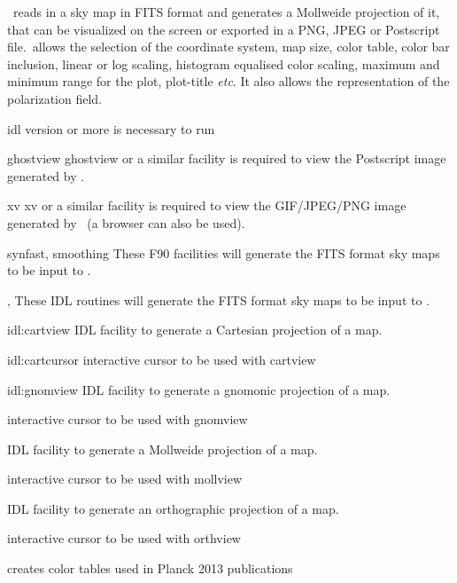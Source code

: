 \begin{codedescription}
{\thedocid \ reads in a \healpix sky map in FITS format and generates a
Mollweide projection of it, that can be visualized on the screen or
exported in a PNG, JPEG or Postscript file.\thedocid \  allows the selection of
the coordinate system, map size, color table, color bar inclusion,
linear or log scaling, histogram equalised
color scaling, maximum and 
minimum range for the plot, plot-title {\it etc}. It also allows the representation of the
polarization field. }
\end{codedescription}


%

\newpage
\begin{related}
  \begin{sulist}{} %
  \item[idl] version \idlversion or more is necessary to run \thedocid
  \item[ghostview] ghostview or a similar facility is required to view
	  the Postscript image generated by \thedocid.
  \item[xv] xv or a similar facility is required to view the
            GIF/JPEG/PNG image generated by \thedocid \ (a browser can also 
            be used).
  \item[synfast, smoothing] These F90 \healpix facilities will generate the FITS format 
            sky maps to be input to \thedocid.
  \item[\htmlref{isynfast}{idl:isynfast}, \htmlref{ismoothing}{idl:ismoothing}] These IDL routines will generate the FITS format 
            sky maps to be input to \thedocid.
  \item[{\htmlref{cartview} {idl:cartview}}] 
	IDL facility to generate a Cartesian projection of
  	a \healpix map.
  \item[{\htmlref{cartcursor} {idl:cartcursor}}] 
	interactive cursor to be used with cartview
  \item[{\htmlref{gnomview} {idl:gnomview}}] 
	IDL facility to generate a gnomonic projection of
  	a \healpix map.
  \item[{\htmlref{gnomcursor}{idl:gnomcursor}}] 
	interactive cursor to be used with gnomview
  \item[{\htmlref{mollview}{idl:mollview}}] 
	IDL facility to generate a Mollweide projection of
  	a \healpix map.
  \item[{\htmlref{mollcursor}{idl:mollcursor}}] interactive cursor to be used with mollview
  \item[{\htmlref{orthview}{idl:orthview}}] 
	IDL facility to generate an orthographic projection of
  	a \healpix map.
  \item[{\htmlref{orthcursor}{idl:orthcursor}}] 
	interactive cursor to be used with orthview
  \item[{\htmlref{planck\_colors}{idl:planck_colors}}]
        creates color tables used in Planck 2013 publications
  \end{sulist}
\end{related}



